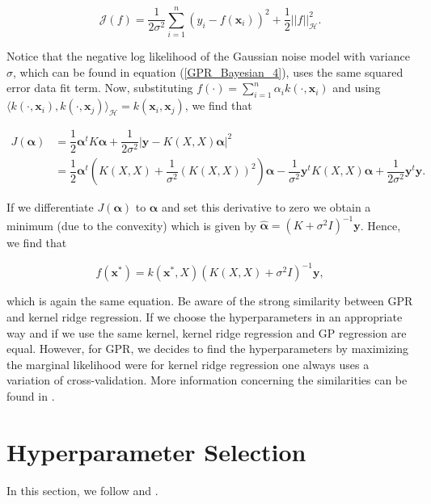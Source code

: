 \documentclass[12pt,a4paper,oneside]{book}
\begin{document}
\begin{equation}
\mathcal{J}(f) =  \dfrac{1}{2\sigma^2}  \sum_{i=1}^n (y_i - f(\bm{x}_i))^2 + \dfrac{1}{2} ||f||^2_{\mathcal{H}} .
\end{equation}

Notice that the negative log likelihood of the Gaussian noise model with variance $\sigma$, which can be found in equation (\ref{GPR_Bayesian_4}), uses the same squared error data fit term. Now, substituting $f(\cdot)= \sum\nolimits_{i=1}^{n} \alpha_i k(\cdot, \bm{x}_i)$ and using $\langle k( \cdot, \bm{x}_i), k(\cdot, \bm{x}_j) \rangle_{\mathcal{H}} = k(\bm{x}_i,\bm{x}_j)$, we find that 

\begin{align}
J(\bm{\alpha}) &= \dfrac{1}{2} \bm{\alpha}^t K \bm{\alpha} + \dfrac{1}{2 \sigma^2} |\bm{y} - K(X,X) \bm{\alpha} | ^2  \nonumber \\
&= \dfrac{1}{2} \bm{\alpha}^t \left( K(X,X) + \dfrac{1}{ \sigma^2} (K(X,X))^2 \right) \bm{\alpha} - \dfrac{1}{ \sigma^2} \bm{y}^t K(X,X) \bm{\alpha} +  \dfrac{1}{2 \sigma^2} \bm{y}^t \bm{y}.
\end{align}

If we differentiate $ J(\bm{\alpha})$ to $\bm{\alpha}$ and set this derivative to zero we obtain a minimum (due to the convexity) which is given by $\hat{\bm{\alpha}} = (K + \sigma^2 I)^{-1} \bm{y}$. Hence, we find that

\begin{equation}\label{Function_Space_final_equation1}
\boxed{f(\bm{x}^{\ast}) = k(\bm{x}^{\ast},X) (K(X,X) + \sigma^2 I)^{-1} \bm{y}},
\end{equation}


which is again the same equation. Be aware of the strong similarity between GPR and kernel ridge regression. If we choose the hyperparameters in an appropriate way and if we use the same kernel, kernel ridge regression and GP regression are equal. However, for GPR, we decides to find the hyperparameters by maximizing the marginal likelihood were for kernel ridge regression one always uses a variation of cross-validation. More information concerning the similarities can be found in \cite{welling2013kernel}.

\section{Hyperparameter Selection}\label{section_hyperparameter_selection}

In this section, we follow \cite{GPRbook} and \cite{camillagpr}. 
\end{document}
